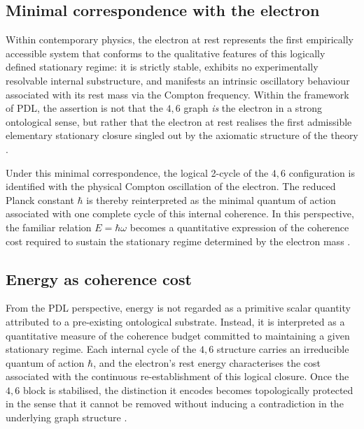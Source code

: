 \documentclass[11pt,a4paper]{article}
\begin{document}
\subsection{Minimal correspondence with the electron}
\label{subsec:electron_correspondence}

Within contemporary physics, the electron at rest represents the first empirically accessible system that conforms to the qualitative features of this logically defined stationary regime: it is strictly stable, exhibits no experimentally resolvable internal substructure, and manifests an intrinsic oscillatory behaviour associated with its rest mass via the Compton frequency. Within the framework of PDL, the assertion is not that the \(4,6\) graph \emph{is} the electron in a strong ontological sense, but rather that the electron at rest realises the first admissible elementary stationary closure singled out by the axiomatic structure of the theory \citep{PDL_Main_2026,PDL_intro}.

Under this minimal correspondence, the logical 2-cycle of the \(4,6\) configuration is identified with the physical Compton oscillation of the electron. The reduced Planck constant \(\hbar\) is thereby reinterpreted as the minimal quantum of action associated with one complete cycle of this internal coherence. In this perspective, the familiar relation \(E = \hbar \omega\) becomes a quantitative expression of the coherence cost required to sustain the stationary regime determined by the electron mass \citep{PDL_Main_2026}.

\subsection{Energy as coherence cost}
\label{subsec:energy_coherence}

From the PDL perspective, energy is not regarded as a primitive scalar quantity attributed to a pre-existing ontological substrate. Instead, it is interpreted as a quantitative measure of the coherence budget committed to maintaining a given stationary regime. Each internal cycle of the \(4,6\) structure carries an irreducible quantum of action \(\hbar\), and the electron’s rest energy characterises the cost associated with the continuous re-establishment of this logical closure. Once the \(4,6\) block is stabilised, the distinction it encodes becomes topologically protected in the sense that it cannot be removed without inducing a contradiction in the underlying graph structure \citep{PDL_Main_2026,PDL_intro}.
\end{document}
